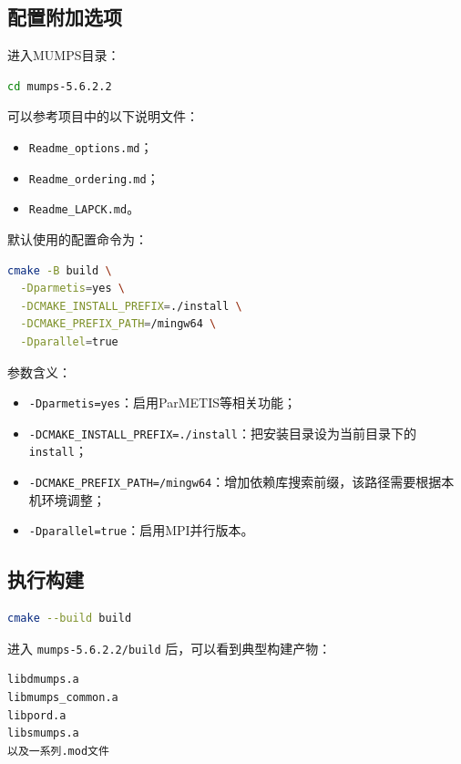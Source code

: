 \subsection{配置附加选项}

进入MUMPS目录：

\begin{lstlisting}[language=bash]
cd mumps-5.6.2.2
\end{lstlisting}

可以参考项目中的以下说明文件：

\begin{itemize}
  \item \texttt{Readme\_options.md}；
  \item \texttt{Readme\_ordering.md}；
  \item \texttt{Readme\_LAPCK.md}。
\end{itemize}

默认使用的配置命令为：

\begin{lstlisting}[language=bash]
cmake -B build \
  -Dparmetis=yes \
  -DCMAKE_INSTALL_PREFIX=./install \
  -DCMAKE_PREFIX_PATH=/mingw64 \
  -Dparallel=true
\end{lstlisting}

参数含义：

\begin{itemize}
  \item \texttt{-Dparmetis=yes}：启用ParMETIS等相关功能；
  \item \texttt{-DCMAKE\_INSTALL\_PREFIX=./install}：把安装目录设为当前目录下的 \texttt{install}；
  \item \texttt{-DCMAKE\_PREFIX\_PATH=/mingw64}：增加依赖库搜索前缀，该路径需要根据本机环境调整；
  \item \texttt{-Dparallel=true}：启用MPI并行版本。
\end{itemize}

\subsection{执行构建}

\begin{lstlisting}[language=bash]
cmake --build build
\end{lstlisting}

进入 \texttt{mumps-5.6.2.2/build} 后，可以看到典型构建产物：

\begin{lstlisting}
libdmumps.a
libmumps_common.a
libpord.a
libsmumps.a
以及一系列.mod文件
\end{lstlisting}

